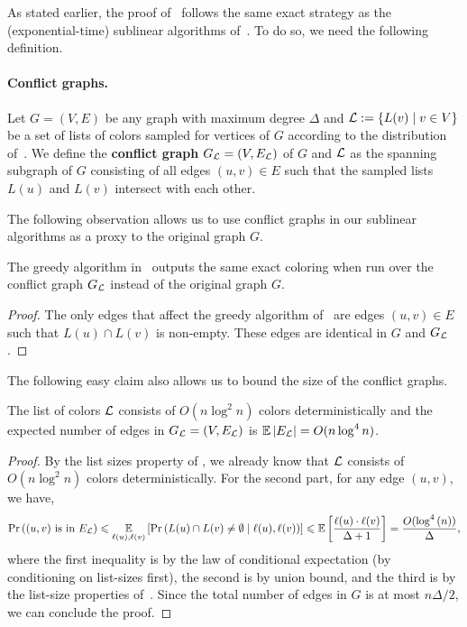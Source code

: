 As stated earlier, the proof of~ follows the same exact strategy as the (exponential-time) sublinear algorithms of~\cite{AssadiCK19}. To do so, we need the following definition. 

\paragraph{Conflict graphs.} Let $G=(V,E)$ be any graph with maximum degree $\Delta$ and $\mathcal{L} := \left\{ L(v) \mid v \in V \right\}$ be a set of lists of colors sampled for vertices of $G$ according to the distribution of~. 
We define the \textbf{conflict graph} $G_{\mathcal{L}} = (V, E_{\mathcal{L}})$ of $G$ and $\mathcal{L}$ as the spanning subgraph of $G$ consisting of all edges $(u,v) \in E$ such that the sampled lists $L(u)$ and $L(v)$ intersect with each other. 

The following observation allows us to use conflict graphs in our sublinear algorithms as a proxy to the original graph $G$. 

\begin{observation}\label{obs:conflict-graph-use}
	The greedy algorithm in~ outputs the same exact coloring when run over the conflict graph $G_{\mathcal{L}}$ instead of the original graph $G$. 
\end{observation}
\begin{proof}
	The only edges that affect the greedy algorithm of~ are edges $(u,v) \in E$ such that $L(u) \cap L(v)$ is non-empty. These edges are identical in $G$ and $G_{\mathcal{L}}$. 
\end{proof}

The following easy claim also allows us to bound the size of the conflict graphs. 

\begin{claim}\label{clm:conflict-graph-size}
	The list of colors $\mathcal{L}$ consists of $O(n\log^2{n})$ colors deterministically and the expected number of edges in $G_{\mathcal{L}}=(V,E_{\mathcal{L}})$ is $\operatorname*{{\mathbb{E}}}\left\vert{E_{\ensuremath{\mathcal{L}}}}\right\vert = O(n\log^4{n})$. 
\end{claim}
\begin{proof}
	By the list sizes property of , we already know that  $\mathcal{L}$ consists of $O(n\log^2{n})$ colors deterministically. For the second part, for any edge $(u,v)$, we have, 
	\[
		\operatorname*{\textnormal{Pr}}\left(\text{$(u,v)$ is in $E_{\mathcal{L}}$}\right) \leqslant \operatorname*{{\mathbb{E}}}_{\ell(u),\ell(v)}\left[\operatorname*{\textnormal{Pr}}\left(L(u) \cap L(v) \neq \emptyset \mid \ell(u),\ell(v)\right)\right] \leqslant \operatorname*{{\mathbb{E}}}\left[\frac{\ell(u) \cdot \ell(v)}{\Delta+1}\right] = \frac{O(\log^4{(n)})}{\Delta},
	\]
	where the first inequality is by the law of conditional expectation (by conditioning on list-sizes first), the second is by union bound, and the third is by the list-size properties of~. Since the total
	number of edges in $G$ is at most $n\Delta/2$, we can conclude the proof. 	
\end{proof}

